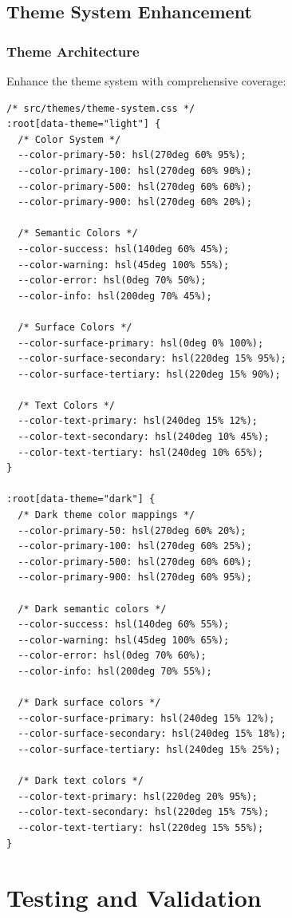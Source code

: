 \documentclass[11pt]{article}
\begin{document}
\subsection{Theme System Enhancement}

\subsubsection{Theme Architecture}

Enhance the theme system with comprehensive coverage:

\begin{lstlisting}[style=css]
/* src/themes/theme-system.css */
:root[data-theme="light"] {
  /* Color System */
  --color-primary-50: hsl(270deg 60% 95%);
  --color-primary-100: hsl(270deg 60% 90%);
  --color-primary-500: hsl(270deg 60% 60%);
  --color-primary-900: hsl(270deg 60% 20%);
  
  /* Semantic Colors */
  --color-success: hsl(140deg 60% 45%);
  --color-warning: hsl(45deg 100% 55%);
  --color-error: hsl(0deg 70% 50%);
  --color-info: hsl(200deg 70% 45%);
  
  /* Surface Colors */
  --color-surface-primary: hsl(0deg 0% 100%);
  --color-surface-secondary: hsl(220deg 15% 95%);
  --color-surface-tertiary: hsl(220deg 15% 90%);
  
  /* Text Colors */
  --color-text-primary: hsl(240deg 15% 12%);
  --color-text-secondary: hsl(240deg 10% 45%);
  --color-text-tertiary: hsl(240deg 10% 65%);
}

:root[data-theme="dark"] {
  /* Dark theme color mappings */
  --color-primary-50: hsl(270deg 60% 20%);
  --color-primary-100: hsl(270deg 60% 25%);
  --color-primary-500: hsl(270deg 60% 60%);
  --color-primary-900: hsl(270deg 60% 95%);
  
  /* Dark semantic colors */
  --color-success: hsl(140deg 60% 55%);
  --color-warning: hsl(45deg 100% 65%);
  --color-error: hsl(0deg 70% 60%);
  --color-info: hsl(200deg 70% 55%);
  
  /* Dark surface colors */
  --color-surface-primary: hsl(240deg 15% 12%);
  --color-surface-secondary: hsl(240deg 15% 18%);
  --color-surface-tertiary: hsl(240deg 15% 25%);
  
  /* Dark text colors */
  --color-text-primary: hsl(220deg 20% 95%);
  --color-text-secondary: hsl(220deg 15% 75%);
  --color-text-tertiary: hsl(220deg 15% 55%);
}
\end{lstlisting}

\section{Testing and Validation}
\end{document}
